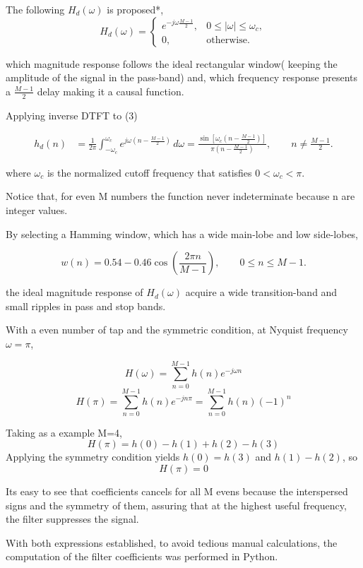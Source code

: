 \documentclass[12 pt]{article}
\begin{document}
	The following $H_d(\omega)$ is proposed*, 
	\begin{equation}
		H_d(\omega)=
		\begin{cases}
			e^{-j\omega\frac{M-1}{2}}, & 0 \leq |\omega| \leq \omega_c,\\[6pt]
			0, & \text{otherwise}.
		\end{cases}
	\end{equation}
	 
	 which magnitude response follows the ideal rectangular window( keeping the amplitude of the signal in the pass-band) and, which frequency response presents a $\frac{M-1}{2}$ delay making it a causal function.
	 
	 Applying inverse DTFT  to (3) 
	 
	 \begin{equation*}
	 	\begin{aligned}
	 		h_d(n)
	 		&=
	 		\frac{1}{2\pi}
	 		\int_{-\omega_c}^{\omega_c}
	 		e^{j\omega\left(n-\frac{M-1}{2}\right)}
	 		\,d\omega =
	 		\frac{
	 			\sin\left[
	 			\omega_c\left(n-\frac{M-1}{2}\right)
	 			\right]
	 		}{
	 			\pi\left(n-\frac{M-1}{2}\right)
	 		},
	 		\qquad
	 		n\neq\frac{M-1}{2}.
	 	\end{aligned}
	 \end{equation*}
	
	where $\omega_c$ is the normalized cutoff frequency that satisfies $0<\omega_c < \pi$. 
	
	Notice that, for even M numbers the function never indeterminate because n are integer values. 
	
	By selecting a Hamming window, which has a wide main-lobe and low side-lobes,
	
	\begin{equation*}
		w(n)=0.54-0.46\cos\left(\frac{2\pi n}{M-1}\right),
		\qquad 0\leq n\leq M-1.
	\end{equation*}
	
	the ideal magnitude response of $H_d(\omega)$ acquire a wide transition-band and small ripples in pass and stop bands.
	
	With a even number of tap and the symmetric condition, at Nyquist frequency $\omega = \pi$, 
	
	\[	H(\omega) = \sum_{n=0}^{M-1} h(n) e^{-j\omega n} \]
	\[	H(\pi) = \sum_{n=0}^{M-1} h(n) e^{-jn\pi} =  \sum_{n=0}^{M-1} h(n) (-1)^n \]
	
	Taking as a example M=4, 
	\[	H(\pi) = h(0)-h(1)+ h(2)-h(3)\]
	Applying the symmetry condition yields $h(0)=h(3) $ and $h(1)-h(2)$, so 
	\[H(\pi) = 0\]
	
	Its easy to see that coefficients cancels for all M evens because the interspersed signs and the symmetry of them, assuring that at the highest useful frequency, the filter suppresses the signal. 

	With both expressions established, to avoid tedious manual calculations, the computation of the filter coefficients was performed in Python.
	
	
		
\end{document}
